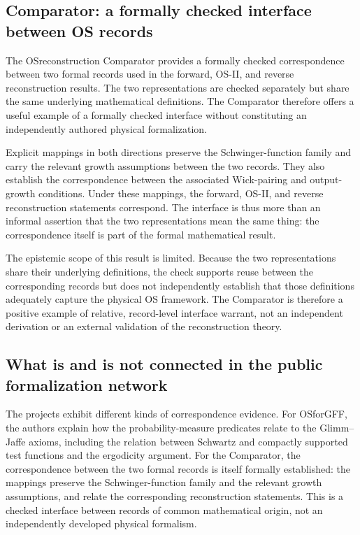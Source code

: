 \documentclass[pdflatex,sn-apa]{sn-jnl}
\begin{document}
\subsection{Comparator: a formally checked interface between OS records}

The OSreconstruction Comparator provides a formally checked correspondence between two formal records used in the forward, OS-II, and reverse reconstruction results. The two representations are checked separately but share the same underlying mathematical definitions. The Comparator therefore offers a useful example of a formally checked interface without constituting an independently authored physical formalization.

Explicit mappings in both directions preserve the Schwinger-function family and carry the relevant growth assumptions between the two records. They also establish the correspondence between the associated Wick-pairing and output-growth conditions. Under these mappings, the forward, OS-II, and reverse reconstruction statements correspond. The interface is thus more than an informal assertion that the two representations mean the same thing: the correspondence itself is part of the formal mathematical result.

The epistemic scope of this result is limited. Because the two representations share their underlying definitions, the check supports reuse between the corresponding records but does not independently establish that those definitions adequately capture the physical OS framework. The Comparator is therefore a positive example of relative, record-level interface warrant, not an independent derivation or an external validation of the reconstruction theory.

\subsection{What is and is not connected in the public formalization network}

The projects exhibit different kinds of correspondence evidence. For OSforGFF, the authors explain how the probability-measure predicates relate to the Glimm--Jaffe axioms, including the relation between Schwartz and compactly supported test functions and the ergodicity argument. For the Comparator, the correspondence between the two formal records is itself formally established: the mappings preserve the Schwinger-function family and the relevant growth assumptions, and relate the corresponding reconstruction statements. This is a checked interface between records of common mathematical origin, not an independently developed physical formalism.
\end{document}
